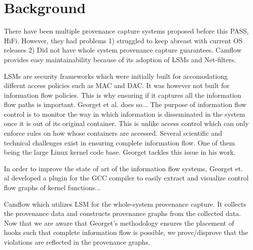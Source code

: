 \section{Background}

\label{A small recap into data provenance and whole system provenance capture}

There have been multiple provenance capture systems proposed before this PASS, HiFi. However, they had problems 1) struggled to keep abreast with current OS releases 2) Did not have whole system provenance capture guarantees. Camflow provides easy maintainability because of its adoption of LSMs and Net-filters.
\vskip 0.1in
\label{LSMs}

LSMs are security frameworks which were initially built for accomodationg differnt access policies such as MAC and DAC. It was however not built for information flow policies. This is why ensuring if it captures all the information flow paths is important. Georget et al. does so...
\vskip 0.1in
\label{Information flow}
The purpose of information flow control is to monitor the way in which information is disseminated in the system once it is out of its original container. This is unlike access control which can only enforce rules on how whose containers are accessed. Several scientific and technical challenges exist in ensuring complete information flow. One of them being the large Linux kernel code base. Georget tackles this issue in his work.



\label{Georget methodology}
In order to improve the state of art of the information flow systems, Georget et. al developed a  plugin for the GCC compiler to easily extract and visualize control flow graphs of kernel functions...


\label{Camflow}
Camflow which utilizes LSM for the whole-system provenance capture. It collects the provenance data and constructs provenance graphs from the collected data. Now that we are aware that Georget's methodology ensures the placement of hooks such that complete information flow is possible, we prove/disprove that the violations are reflected in the provenance graphs.